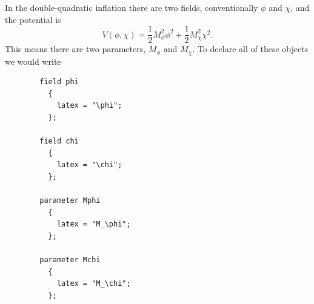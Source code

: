 \documentclass[11pt,a4paper]{article}
\newenvironment{example}{\begin{tcolorbox}[enhanced,breakable,colback=black!10,colbacktitle=black!20,colframe=black!40,coltitle=black,title=Example,fonttitle=\sffamily\fontseries{b}\selectfont]}{\end{tcolorbox}}
\begin{document}
\begin{example}
    In the double-quadratic inflation there are two
    fields, conventionally $\phi$ and $\chi$,
    and the potential is
    \begin{equation}
        V(\phi, \chi) = \frac{1}{2} M_\phi^2 \phi^2
            + \frac{1}{2} M_\chi^2 \chi^2 .
    \end{equation}
    This means there are two parameters, $M_\phi$
    and $M_\chi$.
    To declare all of these objects we would write
    \begin{verbatim}
        field phi
          {
            latex = "\phi";
          };
        
        field chi
          {
            latex = "\chi";
          };
        
        parameter Mphi
          {
            latex = "M_\phi";
          };
        
        parameter Mchi
          {
            latex = "M_\chi";
          };    
    \end{verbatim}
\end{example}
\end{document}
